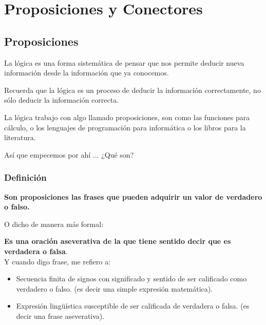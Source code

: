 \documentclass[12pt, fleqn]{report}                             %
\begin{document}
    \chapter{Proposiciones y Conectores}
        \clearpage




        \section{Proposiciones}

            La lógica es una forma sistemática de pensar que nos permite deducir
            nueva información desde la información que ya conocemos.

            Recuerda que la lógica es un proceso de deducir la información correctamente,
            no sólo deducir la información correcta.

            La lógica trabajo con algo llamado proposiciones, son como las funciones para
            cálculo, o los lenguajes de programación para informática o los libros para la literatura.

            Así que empecemos por ahí ... ¿Qué son?

            \subsection{Definición}
                
                \textbf{Son proposiciones las frases que pueden adquirir un valor de verdadero o falso.}
                
                O dicho de manera más formal:

                \textbf{Es una oración aseverativa de la que tiene sentido decir que es verdadera o falsa}.\\

                Y cuando digo frase, me refiero a:
                \begin{itemize}
                    \item Secuencia finita de signos con significado y sentido de ser calificado
                            como verdadero o falso. (es decir una simple expresión matemática).

                    \item Expresión lingüística susceptible de ser calificada de verdadera o falsa.
                            (es decir una frase aseverativa).
                \end{itemize}
\end{document}
